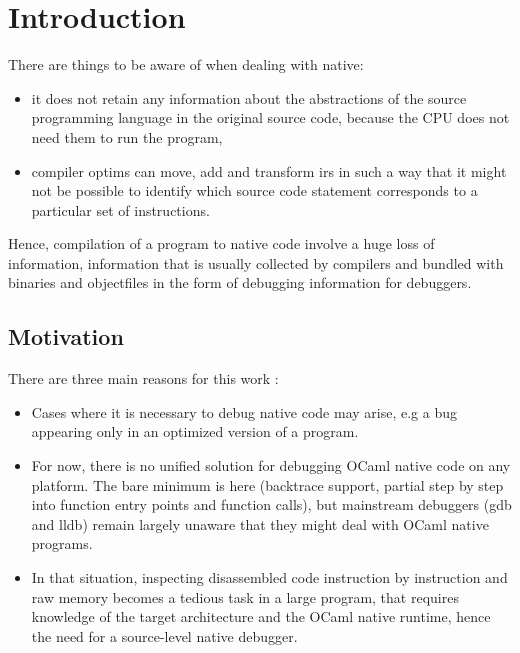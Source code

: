 \chapter{Introduction\label{cha:chapter1}}

There are things to be aware of when dealing with \gls{native}:
\begin{itemize}
    \item it does not retain any information about
        the abstractions of the source programming language in the original
        source code, because the CPU does not need them to run the program,
    \item compiler \glspl{optim} can move, add and transform \glspl{ir}
        in such a way that it might not be possible to identify which
        source code statement corresponds to a particular set of instructions.
\end{itemize}

Hence, compilation of a program to native code involve a huge loss of information, information that is usually collected by compilers and bundled with binaries and \glspl{objectfile} in the form of debugging information for debuggers.

\section{Motivation\label{sec:moti}}

There are three main reasons for this work :

\begin{itemize}
    \item Cases where it is necessary to debug native code may arise, e.g a bug
        appearing only in an optimized version of a program.
    \item For now, there is no unified solution for debugging OCaml native
        code on any platform. The bare minimum is here (\gls{backtrace} support,
        partial step by step into function entry points and function calls),
        but mainstream debuggers (gdb and lldb) remain largely unaware that they
        might deal with OCaml native programs.
    \item In that situation, inspecting disassembled code instruction by
        instruction and raw memory becomes a tedious task in a large program,
        that requires knowledge of the target architecture and the OCaml native
        runtime, hence the need for a source-level native debugger.
\end{itemize}

